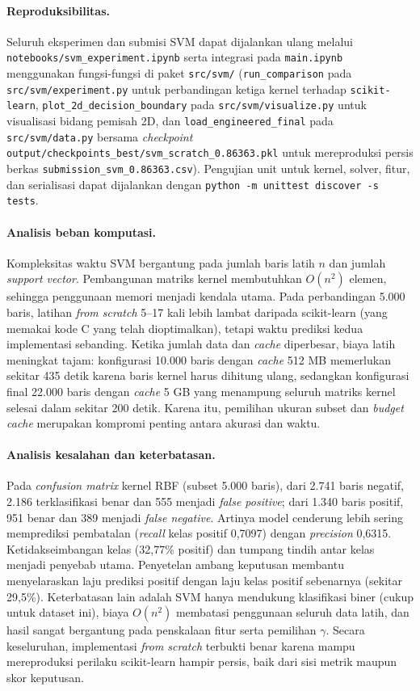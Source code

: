 \paragraph{Reproduksibilitas.}
Seluruh eksperimen dan submisi SVM dapat dijalankan ulang melalui
\texttt{notebooks/svm\_experiment.ipynb} serta integrasi pada
\texttt{main.ipynb} menggunakan fungsi-fungsi di paket \texttt{src/svm/}
(\texttt{run\_comparison} pada \texttt{src/svm/experiment.py} untuk perbandingan
ketiga kernel terhadap \texttt{scikit-learn}, \texttt{plot\_2d\_decision\_boundary}
pada \texttt{src/svm/visualize.py} untuk visualisasi bidang pemisah 2D, dan
\texttt{load\_engineered\_final} pada \texttt{src/svm/data.py} bersama
\textit{checkpoint} \texttt{output/checkpoints\_best/svm\_scratch\_0.86363.pkl}
untuk mereproduksi persis berkas \texttt{submission\_svm\_0.86363.csv}). Pengujian
unit untuk kernel, solver, fitur, dan serialisasi dapat dijalankan dengan
\texttt{python -m unittest discover -s tests}.

\paragraph{Analisis beban komputasi.}
Kompleksitas waktu SVM bergantung pada jumlah baris latih $n$ dan jumlah
\textit{support vector}. Pembangunan matriks kernel membutuhkan $O(n^2)$
elemen, sehingga penggunaan memori menjadi kendala utama. Pada perbandingan
5.000 baris, latihan \textit{from scratch} 5--17 kali lebih lambat daripada
scikit-learn (yang memakai kode C yang telah dioptimalkan), tetapi waktu
prediksi kedua implementasi sebanding. Ketika jumlah data dan \textit{cache}
diperbesar, biaya latih meningkat tajam: konfigurasi 10.000 baris dengan
\textit{cache} 512 MB memerlukan sekitar 435 detik karena baris kernel harus
dihitung ulang, sedangkan konfigurasi final 22.000 baris dengan
\textit{cache} 5 GB yang menampung seluruh matriks kernel selesai dalam
sekitar 200 detik. Karena itu, pemilihan ukuran subset dan \textit{budget}
\textit{cache} merupakan kompromi penting antara akurasi dan waktu.

\paragraph{Analisis kesalahan dan keterbatasan.}
Pada \textit{confusion matrix} kernel RBF (subset 5.000 baris), dari 2.741
baris negatif, 2.186 terklasifikasi benar dan 555 menjadi \textit{false
positive}; dari 1.340 baris positif, 951 benar dan 389 menjadi \textit{false
negative}. Artinya model cenderung lebih sering memprediksi pembatalan
(\textit{recall} kelas positif 0,7097) dengan \textit{precision} 0,6315.
Ketidakseimbangan kelas (32,77\% positif) dan tumpang tindih antar kelas
menjadi penyebab utama. Penyetelan ambang keputusan membantu menyelaraskan
laju prediksi positif dengan laju kelas positif sebenarnya (sekitar 29,5\%).
Keterbatasan lain adalah SVM hanya mendukung klasifikasi biner (cukup untuk
dataset ini), biaya $O(n^2)$ membatasi penggunaan seluruh data latih, dan hasil
sangat bergantung pada penskalaan fitur serta pemilihan $\gamma$. Secara
keseluruhan, implementasi \textit{from scratch} terbukti benar karena mampu
mereproduksi perilaku scikit-learn hampir persis, baik dari sisi metrik maupun
skor keputusan.

